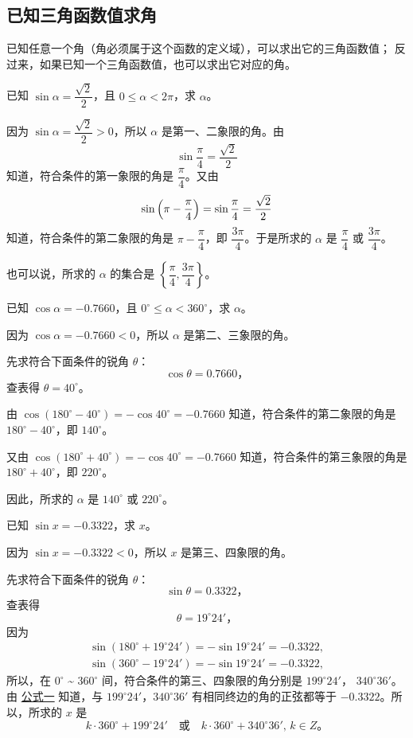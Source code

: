 \subsection{已知三角函数值求角}\label{subsec:2-6}

已知任意一个角（角必须属于这个函数的定义域），可以求出它的三角函数值；
反过来，如果已知一个三角函数值，也可以求出它对应的角。

\vspace{0.5em}
\liti 已知 $\sin\alpha = \dfrac{\sqrt{2}}{2}$，且 $0 \leqslant \alpha < 2\pi$，求 $\alpha$。
\vspace{0.5em}

\jie 因为 $\sin\alpha = \dfrac{\sqrt{2}}{2} > 0$，所以 $\alpha$ 是第一、二象限的角。由
$$\sin \dfrac \pi 4 = \dfrac{\sqrt{2}}{2}$$
知道，符合条件的第一象限的角是 $\dfrac \pi 4$。又由
$$\sin \left( \pi - \dfrac \pi 4 \right) = \sin \dfrac \pi 4 = \dfrac{\sqrt{2}}{2} \vspace{0.5em}$$
知道，符合条件的第二象限的角是 $\pi - \dfrac \pi 4$，即 $\dfrac{3\pi}{4}$。于是所求的 $\alpha$ 是 $\dfrac \pi 4$ 或 $\dfrac{3\pi}{4}$。

\vspace{0.5em}
也可以说，所求的 $\alpha$ 的集合是 $\left\{ \dfrac \pi 4, \dfrac{3\pi}{4} \right\}$。
\vspace{0.5em}

\liti 已知 $\cos\alpha = -0.7660$，且 $0^\circ \leqslant \alpha < 360^\circ$，求 $\alpha$。

\jie 因为 $\cos\alpha = -0.7660 < 0$，所以 $\alpha$ 是第二、三象限的角。

先求符合下面条件的锐角 $\theta$：
$$\cos\theta = 0.7660 \text{，}$$
查表得 \qquad $\theta = 40^\circ$。

由 $\cos(180^\circ - 40^\circ) = -\cos 40^\circ = -0.7660$ 知道，符合条件的第二象限的角是 $180^\circ - 40^\circ$，即 $140^\circ$。

又由 $\cos(180^\circ + 40^\circ) = -\cos 40^\circ = -0.7660$ 知道，符合条件的第三象限的角是 $180^\circ + 40^\circ$，即 $220^\circ$。

因此，所求的 $\alpha$ 是 $140^\circ$ 或 $220^\circ$。

\liti 已知 $\sin x = -0.3322$，求 $x$。

\jie 因为 $\sin x = -0.3322 < 0$，所以 $x$ 是第三、四象限的角。

先求符合下面条件的锐角 $\theta$：
$$\sin\theta = 0.3322 \text{，}$$
查表得
$$\theta = 19^\circ 24' \text{，}$$
因为
$$\begin{gathered}
    \sin(180^\circ + 19^\circ 24') = -\sin 19^\circ 24' = -0.3322, \\
    \sin(360^\circ - 19^\circ 24') = -\sin 19^\circ 24' = -0.3322,
\end{gathered}$$
所以，在 $0^\circ$ \~{} $360^\circ$ 间，符合条件的第三、四象限的角分别是 $199^\circ 24'$，
$340^\circ 36'$。由 \hyperref[gongshi:1]{公式一} 知道，与 $199^\circ 24'$，$340^\circ 36'$
有相同终边的角的正弦都等于 $-0.3322$。所以，所求的 $x$ 是
$$k \cdot 360^\circ + 199^\circ 24' \quad \text{或} \quad k \cdot 360^\circ + 340^\circ 36', \, k\in Z \text{。} $$

